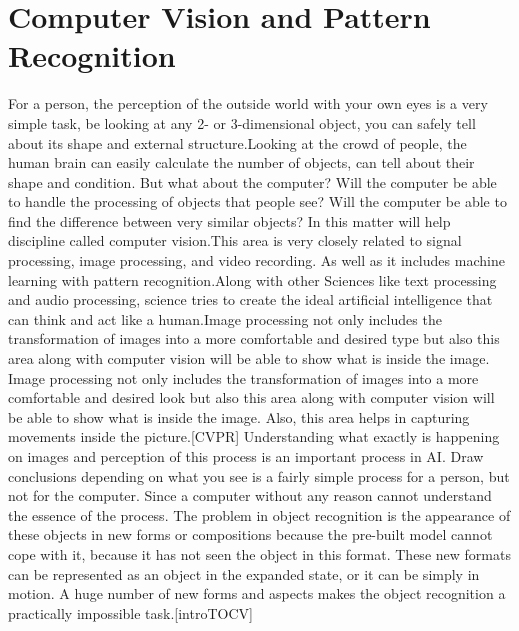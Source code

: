\section{Computer Vision and Pattern Recognition} \label{sec:3.2}
\vspace{-0.5cm}
\noindent For a person, the perception of the outside world with your own eyes is a very simple task, be looking at any 2- or 3-dimensional object, you can safely tell about its shape and external structure.Looking at the crowd of people, the human brain can easily calculate the number of objects, can tell about their shape and condition. But what about the computer? Will the computer be able to handle the processing of objects that people see? Will the computer be able to find the difference between very similar objects? In this matter will help discipline called computer vision.This area is very closely related to signal processing, image processing, and video recording. As well as it includes machine learning with pattern recognition.Along with other Sciences like text processing and audio processing, science tries to create the ideal artificial intelligence that can think and act like a human.Image processing not only includes the transformation of images into a more comfortable and desired type but also this area along with computer vision will be able to show what is inside the image. Image processing not only includes the transformation of images into a more comfortable and desired look but also this area along with computer vision will be able to show what is inside the image. Also, this area helps in capturing movements inside the picture.[CVPR]
Understanding what exactly is happening on images and perception of this process is an important process in AI. Draw conclusions depending on what you see is a fairly simple process for a person, but not for the computer. Since a computer without any reason cannot understand the essence of the process. The problem in object recognition is the appearance of these objects in new forms or compositions because the pre-built model cannot cope with it, because it has not seen the object in this format. These new formats can be represented as an object in the expanded state, or it can be simply in motion. A huge number of new forms and aspects makes the object recognition a practically impossible task.[introTOCV]

\vspace{-0.3cm}


